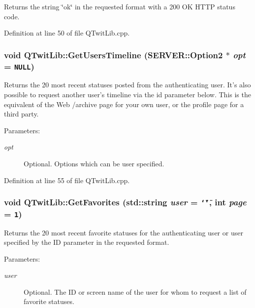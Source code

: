 Returns the string \char`\"{}ok\char`\"{} in the requested format with a 200 OK HTTP status code. 

Definition at line 50 of file QTwitLib.cpp.\hypertarget{classQTwitLib_999f01850a12a88d243332dc2bf755f4}{
\subsubsection{\setlength{\rightskip}{0pt plus 5cm}void QTwitLib::GetUsersTimeline ({\bf SERVER::Option2} $\ast$ {\em opt} = {\tt NULL})}}
\label{classQTwitLib_999f01850a12a88d243332dc2bf755f4}


Returns the 20 most recent statuses posted from the authenticating user. It's also possible to request another user's timeline via the id parameter below. This is the equivalent of the Web /archive page for your own user, or the profile page for a third party. \begin{Desc}
\item[Parameters:]
\begin{description}
\item[{\em opt}]Optional. Options which can be user specified. \end{description}
\end{Desc}


Definition at line 55 of file QTwitLib.cpp.\hypertarget{classQTwitLib_7b3774941753d8746a55ae0df19b7959}{
\subsubsection{\setlength{\rightskip}{0pt plus 5cm}void QTwitLib::GetFavorites (std::string {\em user} = {\tt \char`\"{}\char`\"{}}, \/  int {\em page} = {\tt 1})}}
\label{classQTwitLib_7b3774941753d8746a55ae0df19b7959}


Returns the 20 most recent favorite statuses for the authenticating user or user specified by the ID parameter in the requested format. \begin{Desc}
\item[Parameters:]
\begin{description}
\item[{\em user}]Optional. The ID or screen name of the user for whom to request a list of favorite statuses. \end{description}
\end{Desc}


